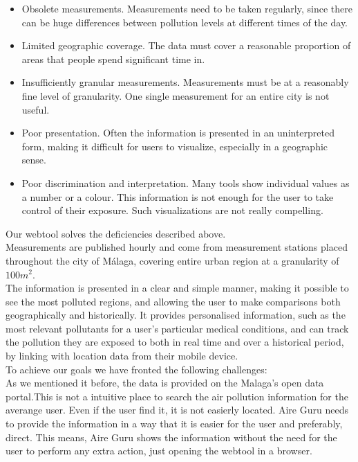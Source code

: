\begin{itemize}

    \item Obsolete measurements. Measurements need to be taken regularly, since there can be huge differences
          between pollution levels at different times of the day.

    \item Limited geographic coverage. The data must cover a reasonable proportion of areas that people spend significant time in.

    \item Insufficiently granular measurements. Measurements must be at a reasonably fine level of granularity. One single measurement for an entire city is not useful.

    \item Poor presentation. Often the information is presented in an uninterpreted form, making it difficult for users to visualize, especially in a geographic sense.

    \item Poor discrimination and interpretation. Many tools show individual values as a number or a colour. This information is not
          enough for the user to take control of their exposure. Such visualizations are not really compelling. 

\end{itemize}

Our webtool solves the deficiencies described above.\\

Measurements are published hourly and come from measurement stations placed throughout the 
city of Málaga, covering entire urban region at a granularity of $100m^2$.\\

The information is presented in a clear and simple manner, making it possible to see the most polluted regions,
and allowing the user to make comparisons both geographically and historically. It provides personalised information, such as the most relevant 
pollutants for a user's particular medical conditions, and can track
the pollution they are exposed to both in real time and over a historical period, by linking with location data from their mobile device. \\

To achieve our goals we have fronted the following challenges:\\

As we mentioned it before, the data is provided on the Malaga's open data portal.This is not a intuitive place to search the
air pollution information for the averange user. Even if the user find it, it is not 
easierly located. Aire Guru needs to provide the information in a way that it is easier for the user and preferably, direct.
This means, Aire Guru shows the information without the need for the user to perform any extra action, just opening the
webtool in a browser.\\


